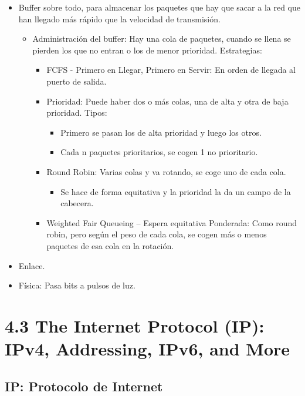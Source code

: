 \documentclass[12pt, twoside, openright]{report} %
\begin{document}
    \begin{itemize}
		\item
		Buffer sobre todo, para almacenar los paquetes que hay que sacar a
		la red que han llegado más rápido que la velocidad de transmisión.

		\begin{itemize}
		\item
			Administración del buffer: Hay una cola de paquetes, cuando se
			llena se pierden los que no entran o los de menor prioridad.
			Estrategias:

			\begin{itemize}
			\item
			FCFS - Primero en Llegar, Primero en Servir: En orden de
			llegada al puerto de salida.
			\item
			Prioridad: Puede haber dos o más colas, una de alta y otra de
			baja prioridad. Tipos:

			\begin{itemize}
			\item
				Primero se pasan los de alta prioridad y luego los otros.
			\item
				Cada n paquetes prioritarios, se cogen 1 no prioritario.
			\end{itemize}
			\item
			Round Robin: Varias colas y va rotando, se coge uno de cada
			cola.

			\begin{itemize}
			\item
				Se hace de forma equitativa y la prioridad la da un campo de
				la cabecera.
			\end{itemize}
			\item
			Weighted Fair Queueing -- Espera equitativa Ponderada: Como
			round robin, pero según el peso de cada cola, se cogen más o
			menos paquetes de esa cola en la rotación.
			\end{itemize}
		\end{itemize}
		\item
		Enlace.
		\item
		Física: Pasa bits a pulsos de luz.
    \end{itemize}
\pagebreak
\section{4.3 The Internet Protocol (IP): IPv4, Addressing, IPv6, and More}
\subsection{IP: Protocolo de Internet}
\end{document}

